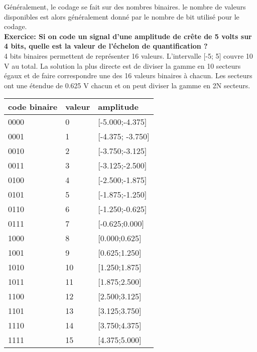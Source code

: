 \documentclass[11pt,a4paper]{article}
\begin{document}
Généralement, le codage se fait sur des nombres binaires. le nombre de valeurs disponibles est alors généralement donné par le nombre de bit utilisé pour le codage.\\

\textbf{Exercice: Si on code un signal d'une amplitude de crête de 5 volts sur 4 bits, quelle est la valeur de l'échelon de quantification ?}\\

4 bits binaires permettent de représenter 16 valeurs. L'intervalle [-5; 5] couvre 10 V au total. La solution la plus directe est de diviser la gamme en 10 secteurs égaux et de faire correspondre une des 16 valeurs binaires à chacun. Les secteurs ont une étendue de 0.625 V chacun et on peut diviser la gamme en 2N secteurs.\\

\begin{table}[h!]
\begin{center}
\begin{tabular}{|p{20mm}|p{10mm}|p{25mm}|}
 \hline
 code binaire &  valeur & amplitude \\
 \hline
 0000 & 0 &  [-5.000;-4.375] \\
 \hline
 0001 & 1 & [-4.375; -3.750]\\
 \hline
 0010 & 2 & [-3.750;-3.125]\\
 \hline
 0011 & 3 & [-3.125;-2.500]\\
 \hline
 0100 & 4 & [-2.500;-1.875]\\
 \hline
 0101 & 5 & [-1.875;-1.250]\\
 \hline
 0110 & 6 & [-1.250;-0.625]\\
 \hline
 0111 & 7 & [-0.625;0.000]\\
 \hline
 1000 & 8 &  [0.000;0.625]\\
 \hline
 1001 & 9 &  [0.625;1.250]\\
 \hline
 1010 & 10 & [1.250;1.875]\\
 \hline
 1011 & 11 & [1.875;2.500]\\
 \hline
 1100 & 12 & [2.500;3.125]\\
 \hline
 1101 & 13 & [3.125;3.750]\\
 \hline
 1110 & 14 & [3.750;4.375]\\
 \hline
 1111 & 15 & [4.375;5.000]\\
 \hline 
\end{tabular}
\end{center}
\end{table}
\end{document}
